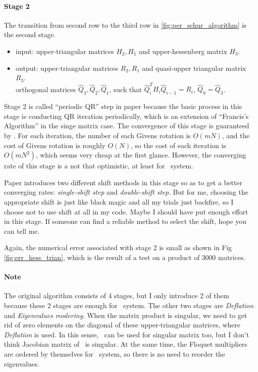 		\paragraph{Stage 2}
		The transition from second row to the third row in \ref{fig:per_schur_algorithm} is the second stage.
		\begin{itemize}
			\item input: upper-triangular matrices $H_{2},H_{1}$ and upper-hessenberg matrix $H_{3}$.
			\item output: upper-triangular matrices $R_{2}, R_{1}$ and quasi-upper triangular matrix $R_{3}$.\\
					orthogonal matrices $\hat{Q}_{3},\hat{Q}_{2},\hat{Q}_{1}$, such that
					$\hat{Q}^{T}_{i}H_{i}\hat{Q}_{i-1}=R_{i}$,
					$\hat{Q}_{0}=\hat{Q}_{3}$.
		\end{itemize}
		Stage 2 is called ``periodic QR'' step in paper  because the basic process
		in this stage is conducting QR iteration periodically, which is an extension of ``Francis's Algorithm''
		in the singe matrix case. The convergence of this stage is guaranteed by
		.
		For each iteration, the number of each Givens rotation is $O(mN)$, and the cost of Givens rotation
		is roughly $O(N)$, so the cost of each iteration is $O(mN^{2})$, which seems very cheap at the first
		glance. However,
		the converging rate of this stage is a not that optimistic, at least for \KS\ system.

		Paper  introduces two different shift methods in this stage so as to get a
		better converging rates: \textit{single-shift step} and \textit{double-shift step}. But for me,
		choosing the appropriate shift is just like black magic and all my trials just backfire, so I choose
		not to use shift at all in my code. Maybe I should have put enough effort in this stage.
		If someone can find a reliable method to select the shift, hope you can tell me.
			
		Again, the numerical error associated with stage 2 is small as shown in Fig \ref{fig:err_hess_trian},
		which is the result of a test on a product of 3000 matrices.

		\paragraph{Note} The original algorithm consists of 4 stages, but I only introduce 2 of them because these
		2 stages are enough for \KS\ system. The other two stages are \textit{Deflation} and \textit{Eigenvalues
		reodering}. When the matrix product is singular, we need to get rid of zero elements on the diagonal of these
		upper-triangular matrices, where \textit{Deflation} is used. In this sense, \psd\ can be used for singular
		matrix too, but I don't think Jacobian matrix of \KSe\ is singular. At the same time, the Floquet multipliers
	 	are ordered by themselves for \KS\ system, so there is no need to reorder the eigenvalues.

